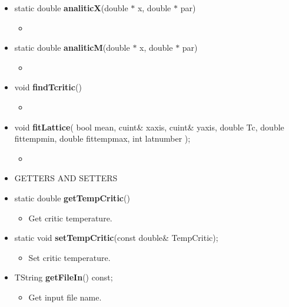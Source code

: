 \begin{itemize}
  \item[] static double \textbf{analiticX}(double $*$ x, double $*$ par)
    \begin{itemize}
    \item[]
    \end{itemize}

  \item[] static double \textbf{analiticM}(double $*$ x, double $*$ par)
    \begin{itemize}
    \item[]
    \end{itemize}

  \item[] void \textbf{findTcritic}()
    \begin{itemize}
    \item[]
    \end{itemize}

  \item[] void \textbf{fitLattice}( bool mean,
    cuint\& x\textunderscore axis,
    cuint\& y\textunderscore axis,
    double Tc,
    double fit\textunderscore temp\textunderscore min,
    double fit\textunderscore temp\textunderscore max,
    int lat\textunderscore number
    );
    \begin{itemize}
    \item[]
    \end{itemize}

    \newpage

  \item[]       GETTERS AND SETTERS \\

  \item[] static double \textbf{getTempCritic}()
    \begin{itemize}
    \item[] Get critic temperature.
    \end{itemize}

  \item[] static void \textbf{setTempCritic}(const double\& \textunderscore TempCritic);
    \begin{itemize}
    \item[] Set critic temperature.
    \end{itemize}

  \item[] TString \textbf{getFileIn}() const;
    \begin{itemize}
    \item[] Get input file name.
    \end{itemize}


\end{itemize}
